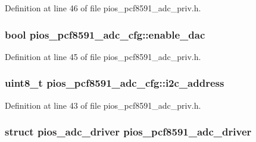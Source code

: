 \-Definition at line 46 of file pios\-\_\-pcf8591\-\_\-adc\-\_\-priv.\-h.

\hypertarget{group___p_i_o_s___p_c_f8591___a_d_c_gad7d1cb320c59f88ea6cf49c65282ba19}{
\subsubsection[{enable\-\_\-dac}]{\setlength{\rightskip}{0pt plus 5cm}bool {\bf pios\-\_\-pcf8591\-\_\-adc\-\_\-cfg\-::enable\-\_\-dac}}}\label{group___p_i_o_s___p_c_f8591___a_d_c_gad7d1cb320c59f88ea6cf49c65282ba19}


\-Definition at line 45 of file pios\-\_\-pcf8591\-\_\-adc\-\_\-priv.\-h.

\hypertarget{group___p_i_o_s___p_c_f8591___a_d_c_gae67d73ed1272f02fb5f31eb18a31d9b8}{
\subsubsection[{i2c\-\_\-address}]{\setlength{\rightskip}{0pt plus 5cm}uint8\-\_\-t {\bf pios\-\_\-pcf8591\-\_\-adc\-\_\-cfg\-::i2c\-\_\-address}}}\label{group___p_i_o_s___p_c_f8591___a_d_c_gae67d73ed1272f02fb5f31eb18a31d9b8}


\-Definition at line 43 of file pios\-\_\-pcf8591\-\_\-adc\-\_\-priv.\-h.

\hypertarget{group___p_i_o_s___p_c_f8591___a_d_c_ga5130c9fc21788de966e89cdda587e568}{
\subsubsection[{pios\-\_\-pcf8591\-\_\-adc\-\_\-driver}]{\setlength{\rightskip}{0pt plus 5cm}struct {\bf pios\-\_\-adc\-\_\-driver} {\bf pios\-\_\-pcf8591\-\_\-adc\-\_\-driver}}}\label{group___p_i_o_s___p_c_f8591___a_d_c_ga5130c9fc21788de966e89cdda587e568}


